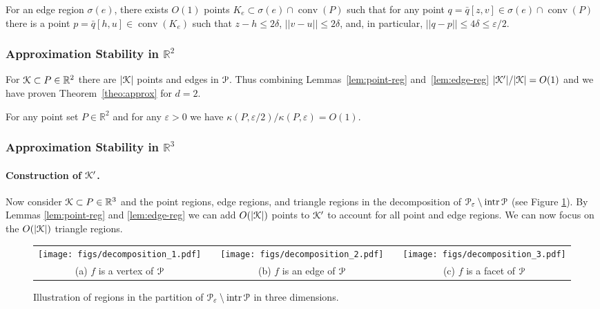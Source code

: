 \documentclass[11pt]{myclass}
\newcommand{\eps}{\varepsilon}
\renewcommand{\b}[1]{\ensuremath{\mathbb{#1}}}
\def\kernel{\EuScript{K}}
\newcommand{\conv}[1]{\mathop{\mathrm{conv}}(#1)}
\newcommand{\polyt}{\EuScript{P}}
\newcommand{\intr}{\mathop{\mathrm{intr}}}
\newcommand{\fq}{\bar{q}}
\newcommand{\point}[3]{{#1}[#3,#2]}
\begin{document}
\begin{lemma}
\label{lem:edge-reg} 
For an edge region $\sigma(e)$, there exists $O(1)$ points $K_e \subset \sigma(e) \cap \conv{P}$ such that for any point $q = \point{\fq}{v}{z} \in \sigma(e) \cap \conv{P}$ there is a point $p= \point{\fq}{u}{h} \in \conv{K_e}$ such that $z-h \leq 2\delta$, $||v-u||\leq 2\delta$, and, in particular, $||q-p|| \leq 4\delta \leq \eps/2$.  
\end{lemma}




\subsubsection{Approximation Stability in $\b{R}^2$}

For $\kernel \subset P \in \b{R}^2$ there are $|\kernel|$ points and edges in $\polyt$.  
Thus combining Lemmas~\ref{lem:point-reg} and~\ref{lem:edge-reg} $|\kernel'|/|\kernel| = O(1)$ and we have proven Theorem~\ref{theo:approx} for $d=2$.  

\begin{theorem}
For any point set $P \in \b{R}^2$ and for any $\eps > 0$ we have 
$
\kappa(P, \eps/2) / \kappa(P,\eps) = O(1).
$
\end{theorem}


\subsubsection{Approximation Stability in $\b{R}^3$}

\paragraph{Construction of $\kernel'$.}
Now consider $\kernel \subset P \in \b{R}^3$ and the point regions, edge regions, and triangle regions in the decomposition of $\polyt_\eps \setminus \intr \polyt$ (see Figure \ref{fig:decomposition}).  By Lemmas \ref{lem:point-reg}  and \ref{lem:edge-reg} we can add $O(|\kernel|)$ points to $\kernel'$ to account for all point and edge regions.  We can now focus on the $O(|\kernel|)$ triangle regions.


\begin{figure}[htb!]
\begin{center}
{\small 
\begin{tabular}{ccccc}
\texttt{[image: figs/decomposition\_1.pdf]} 
& \hspace{1cm} & 
\texttt{[image: figs/decomposition\_2.pdf]} 
& \hspace{1cm} & 
\texttt{[image: figs/decomposition\_3.pdf]}
\\
(a) $f$ is a vertex of $\polyt$ && (b) $f$ is an edge of $\polyt$ && (c) $f$ is a facet of $\polyt$
\end{tabular}
}
\end{center}
\caption{Illustration of regions in the partition of $\polyt_\eps \setminus \intr \polyt$ in three dimensions.}
\label{fig:decomposition}
\end{figure}
\end{document}
